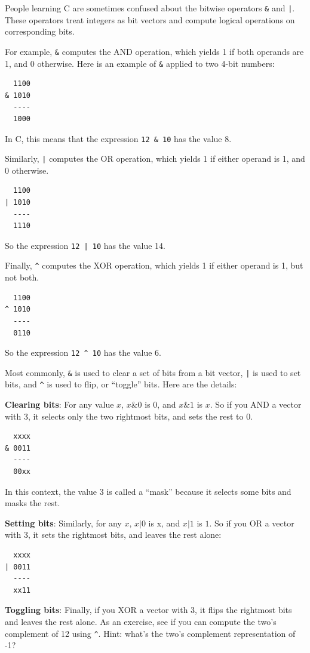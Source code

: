 \documentclass[12pt]{book}
\begin{document}
{People learning C are sometimes confused
about the bitwise operators \verb"&" and \verb"|".  These
operators treat integers as bit vectors and compute logical
operations on corresponding bits.

For example, \verb"&" computes the AND operation, which yields
1 if both operands are 1, and 0 otherwise.  Here is an example
of \verb"&" applied to two 4-bit numbers:
%
\begin{verbatim}
  1100
& 1010
  ----
  1000
\end{verbatim}
%
In C, this means that the expression \verb"12 & 10" has the
value 8.

Similarly, \verb"|" computes the OR operation, which yields
1 if either operand is 1, and 0 otherwise.
%
\begin{verbatim}
  1100
| 1010
  ----
  1110
\end{verbatim}
%
So the expression \verb"12 | 10" has the value 14.

Finally, \verb"^" computes the XOR operation, which yields
1 if either operand is 1, but not both.
%
\begin{verbatim}
  1100
^ 1010
  ----
  0110
\end{verbatim}
%
So the expression \verb"12 ^ 10" has the value 6.

Most commonly, \verb"&" is used to clear a set of bits from
a bit vector, \verb"|" is used to set bits, and \verb"^"
is used to flip, or ``toggle'' bits.  Here are the details:

{\bf Clearing bits}: For any value $x$, $x \& 0$ is 0, and $x \& 1$ is $x$.
So if you AND a vector with 3, it 
selects only the two rightmost bits, and sets the rest to 0.
%
\begin{verbatim}
  xxxx
& 0011
  ----
  00xx
\end{verbatim}
%
In this context, the value 3 is called a ``mask'' because it
selects some bits and masks the rest.

{\bf Setting bits}: Similarly, for any $x$, $x | 0$ is x, and $x | 1$ is $1$.
So if you OR a vector with 3, it sets the rightmost
bits, and leaves the rest alone:
%
\begin{verbatim}
  xxxx
| 0011
  ----
  xx11
\end{verbatim}
%
{\bf Toggling bits}: Finally, if you XOR a vector with 3, it flips the
rightmost bits and leaves the rest alone.  As an exercise, see if you
can compute the two's complement of 12 using \verb"^".  Hint: what's
the two's complement representation of -1?

}
\end{document}
